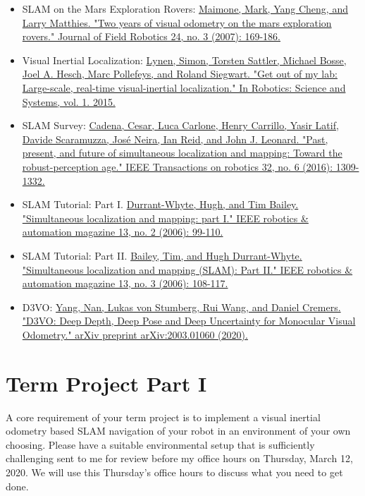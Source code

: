 \begin{itemize}
	\item SLAM on the Mars Exploration Rovers: \href{https://onlinelibrary.wiley.com/doi/pdf/10.1002/rob.20184}{Maimone, Mark, Yang Cheng, and Larry Matthies. "Two years of visual odometry on the mars exploration rovers." Journal of Field Robotics 24, no. 3 (2007): 169-186.}
	\item Visual Inertial Localization: \href{http://www.roboticsproceedings.org/rss11/p37.pdf}{Lynen, Simon, Torsten Sattler, Michael Bosse, Joel A. Hesch, Marc Pollefeys, and Roland Siegwart. "Get out of my lab: Large-scale, real-time visual-inertial localization." In Robotics: Science and Systems, vol. 1. 2015.}
	\item SLAM Survey: \href{https://ieeexplore-ieee-org.proxy.library.upenn.edu/stamp/stamp.jsp?tp=&arnumber=7747236}{Cadena, Cesar, Luca Carlone, Henry Carrillo, Yasir Latif, Davide Scaramuzza, José Neira, Ian Reid, and John J. Leonard. "Past, present, and future of simultaneous localization and mapping: Toward the robust-perception age." IEEE Transactions on robotics 32, no. 6 (2016): 1309-1332.}
	\item SLAM Tutorial: Part I. \href{https://ieeexplore.ieee.org/document/1638022}{Durrant-Whyte, Hugh, and Tim Bailey. "Simultaneous localization and mapping: part I." IEEE robotics \& automation magazine 13, no. 2 (2006): 99-110.}
	\item SLAM Tutorial: Part II. \href{https://ieeexplore.ieee.org/stamp/stamp.jsp?arnumber=1678144}{Bailey, Tim, and Hugh Durrant-Whyte. "Simultaneous localization and mapping (SLAM): Part II." IEEE robotics \& automation magazine 13, no. 3 (2006): 108-117.}
	\item D3VO: \href{https://arxiv.org/abs/2003.01060}{Yang, Nan, Lukas von Stumberg, Rui Wang, and Daniel Cremers. "D3VO: Deep Depth, Deep Pose and Deep Uncertainty for Monocular Visual Odometry." arXiv preprint arXiv:2003.01060 (2020).}
\end{itemize}

\section{Term Project Part I}

A core requirement of your term project is to implement a visual inertial odometry based SLAM navigation of your robot in an environment of your own choosing. Please have a suitable environmental setup that is sufficiently challenging sent to me for review before my office hours on Thursday, March 12, 2020. We will use this Thursday's office hours to discuss what you need to get done.



